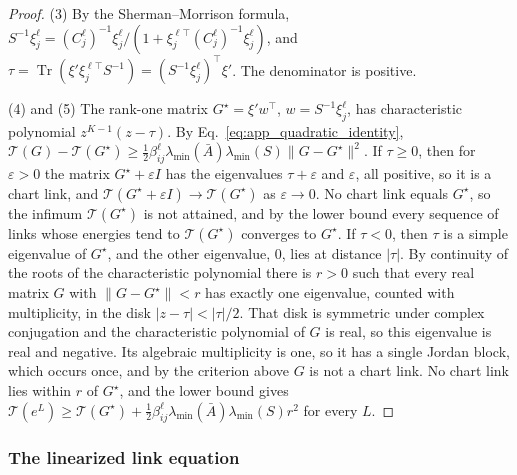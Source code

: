 \documentclass[twoside,11pt]{article}
\begin{document}
\begin{proof}
(3) By the Sherman--Morrison formula, $S^{-1}\xi_j^\ell=(C_j^\ell)^{-1}\xi_j^\ell/(1+\xi_j^{\ell\top}(C_j^\ell)^{-1}\xi_j^\ell)$, and $\tau=\operatorname{Tr}(\xi'\xi_j^{\ell\top}S^{-1})=(S^{-1}\xi_j^\ell)^\top\xi'$. The denominator is positive.

(4) and (5) The rank-one matrix $G^\star=\xi'w^\top$, $w=S^{-1}\xi_j^\ell$, has characteristic polynomial $z^{K-1}(z-\tau)$. By Eq.~\eqref{eq:app_quadratic_identity}, $\mathcal T(G)-\mathcal T(G^\star)\ge\tfrac12\beta_{ij}^\ell\lambda_{\min}(\bar A)\lambda_{\min}(S)\|G-G^\star\|^2$. If $\tau\ge0$, then for $\varepsilon>0$ the matrix $G^\star+\varepsilon I$ has the eigenvalues $\tau+\varepsilon$ and $\varepsilon$, all positive, so it is a chart link, and $\mathcal T(G^\star+\varepsilon I)\to\mathcal T(G^\star)$ as $\varepsilon\to0$. No chart link equals $G^\star$, so the infimum $\mathcal T(G^\star)$ is not attained, and by the lower bound every sequence of links whose energies tend to $\mathcal T(G^\star)$ converges to $G^\star$. If $\tau<0$, then $\tau$ is a simple eigenvalue of $G^\star$, and the other eigenvalue, $0$, lies at distance $|\tau|$. By continuity of the roots of the characteristic polynomial there is $r>0$ such that every real matrix $G$ with $\|G-G^\star\|<r$ has exactly one eigenvalue, counted with multiplicity, in the disk $|z-\tau|<|\tau|/2$. That disk is symmetric under complex conjugation and the characteristic polynomial of $G$ is real, so this eigenvalue is real and negative. Its algebraic multiplicity is one, so it has a single Jordan block, which occurs once, and by the criterion above $G$ is not a chart link. No chart link lies within $r$ of $G^\star$, and the lower bound gives $\mathcal T(e^L)\ge\mathcal T(G^\star)+\tfrac12\beta_{ij}^\ell\lambda_{\min}(\bar A)\lambda_{\min}(S)r^2$ for every $L$.
\end{proof}

\subsubsection{The linearized link equation}
\end{document}
